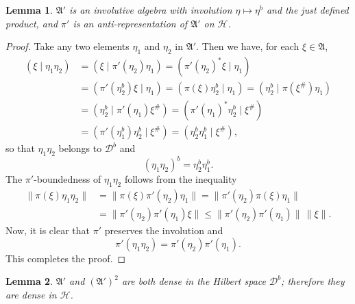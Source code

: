 \documentclass[12pt,b5paper,twoside]{article}
\theoremstyle{takesaki}
\newtheorem{lemma}{Lemma}[section]
\numberwithin{equation}{section}
\begin{document}
\begin{lemma}\label{lem:3.2}
$\mathfrak A'$ is an involutive algebra with involution
$\eta\mapsto\eta^b$ and the just defined product, and $\pi'$ is an
anti-representation of $\mathfrak A'$ on $\mathcal H$.
\end{lemma}

\begin{proof}
Take any two elements $\eta_1$ and $\eta_2$ in $\mathfrak A'$.  Then we
have, for each $\xi\in\mathfrak A$,
\begin{align*}
  (\xi\mid\eta_1\eta_2)
    &=(\xi\mid\pi'(\eta_2)\eta_1)
      =(\pi'(\eta_2)^*\xi\mid\eta_1)\\
    &=(\pi'(\eta_2^b)\xi\mid\eta_1)
      =(\pi(\xi)\eta_2^b\mid\eta_1)
      =(\eta_2^b\mid\pi(\xi^\#)\eta_1)\\
    &=(\eta_2^b\mid\pi'(\eta_1)\xi^\#)
      =(\pi'(\eta_1)^*\eta_2^b\mid\xi^\#)\\
    &=(\pi'(\eta_1^b)\eta_2^b\mid\xi^\#)
      =(\eta_2^b\eta_1^b\mid\xi^\#),
\end{align*}
so that $\eta_1\eta_2$ belongs to $\mathcal D^b$ and
\begin{equation}
  (\eta_1\eta_2)^b=\eta_2^b\eta_1^b.
  \tag{3.4}\label{eq:3.4}
\end{equation}
The $\pi'$-boundedness of $\eta_1\eta_2$ follows from the inequality
\begin{align*}
  \|\pi(\xi)\eta_1\eta_2\|
    &=\|\pi(\xi)\pi'(\eta_2)\eta_1\|
      =\|\pi'(\eta_2)\pi(\xi)\eta_1\|\\
    &=\|\pi'(\eta_2)\pi'(\eta_1)\xi\|
      \leq\|\pi'(\eta_2)\pi'(\eta_1)\|\,\|\xi\|.
\end{align*}
Now, it is clear that $\pi'$ preserves the involution and
\[
  \pi'(\eta_1\eta_2)=\pi'(\eta_2)\pi'(\eta_1).
\]
This completes the proof.
\end{proof}

\begin{lemma}\label{lem:3.3}
$\mathfrak A'$ and $(\mathfrak A')^2$ are both dense in the Hilbert space
$\mathcal D^b$; therefore they are dense in $\mathcal H$.
\end{lemma}
\end{document}
